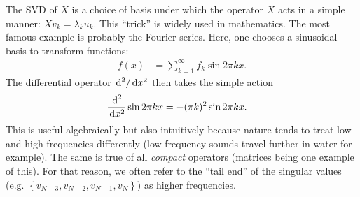 \begin{digression}
  The SVD of $X$ is a choice of basis under which the operator $X$ acts in a simple manner:  $Xv_k=\lambda_ku_k$.  This ``trick'' is widely used in mathematics.  The most famous example is probably the Fourier series.  Here, one chooses a sinusoidal basis to transform functions:
  \begin{align*}
    f(x) &= \sum_{k=1}^\infty f_k\sin2\pi kx.
  \end{align*}
  The differential operator ${\,\mbox{d}}^2/\, \mbox{d}x^2$ then takes the simple action
  \begin{align*}
    \frac{{\,\mbox{d}}^2}{\, \mbox{d}x^2}\sin2\pi kx &= -(\pi k)^2\sin2\pi kx.
  \end{align*}
  This is useful algebraically but also intuitively because nature tends to treat low and high frequencies differently (low frequency sounds travel further in water for example).  The same is true of all \emph{compact} operators (matrices being one example of this).  For that reason, we often refer to the ``tail end'' of the singular values (e.g. $\left\{ v_{N-3}, v_{N-2}, v_{N-1}, v_N \right\}$) as higher frequencies.
\end{digression}

